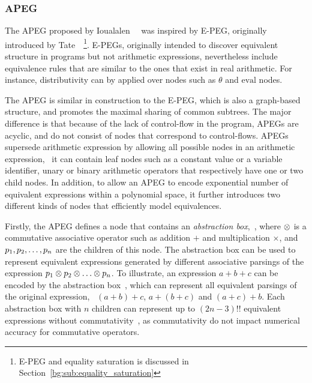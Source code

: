 \subsubsection{APEG}

The APEG proposed by Ioualalen~\etal~\cite{ioualalen} was inspired by E-PEG,
originally introduced by Tate~\etal~\cite{tate09}\footnote{E-PEG and equality
saturation is discussed in Section~\ref{bg:sub:equality_saturation}}.
E-PEGs, originally intended to discover equivalent structure in programs
but not arithmetic expressions, nevertheless include equivalence rules
that are similar to the ones that exist in real arithmetic.  For instance,
distributivity can by applied over nodes such as $\theta$ and $\mathrm{eval}$
nodes.

The APEG is similar in construction to the E-PEG, which is also a graph-based
structure, and promotes the maximal sharing of common subtrees.  The major
difference is that because of the lack of control-flow in the program, APEGs
are acyclic, and do not consist of nodes that correspond to control-flows.
APEGs supersede arithmetic expression by allowing all possible nodes in an
arithmetic expression, \ie~it can contain leaf nodes such as a constant
value or a variable identifier, unary or binary arithmetic operators that
respectively have one or two child nodes.  In addition, to allow an APEG to
encode exponential number of equivalent expressions within a polynomial space,
it further introduces two different kinds of nodes that efficiently model
equivalences.

Firstly, the APEG defines a node that contains an \emph{abstraction box},
\,, where
$\otimes$ is a commutative associative operator such as addition $+$ and
multiplication $\times$, and $p_1, p_2, \mathellipsis, p_n$ are the children of
this node.  The abstraction box can be used to represent equivalent expressions
generated by different associative parsings of the expression $p_1 \otimes
p_2 \otimes \mathellipsis \otimes p_n$.  To illustrate, an expression $a
+ b + c$ can be encoded by the abstraction box \,, which
can represent all equivalent parsings of the original expression, \ie~$(a
+ b) + c$, $a + (b + c)$ and $(a + c) + b$.  Each abstraction box with $n$
children can represent up to $(2n - 3){!!}$ equivalent expressions without
commutativity~\cite{ioualalen, mouilleron}, as commutativity do not impact
numerical accuracy for commutative operators.

